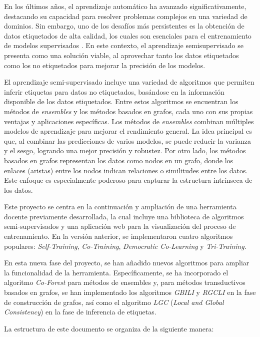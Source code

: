 
En los últimos años, el aprendizaje automático ha avanzado significativamente, destacando su capacidad para resolver problemas complejos en una variedad de dominios. Sin embargo, uno de los desafíos más persistentes es la obtención de datos etiquetados de alta calidad, los cuales son esenciales para el entrenamiento de modelos supervisados . En este contexto, el aprendizaje semisupervisado se presenta como una solución viable, al aprovechar tanto los datos etiquetados como los no etiquetados para mejorar la precisión de los modelos.

El aprendizaje semi-supervisado incluye una variedad de algoritmos que permiten inferir etiquetas para datos no etiquetados, basándose en la información disponible de los datos etiquetados. Entre estos algoritmos se encuentran los métodos de \textit{ensembles} y los métodos basados en grafos, cada uno con sus propias ventajas y aplicaciones específicas. Los métodos de \textit{ensembles} combinan múltiples modelos de aprendizaje para mejorar el rendimiento general. La idea principal es que, al combinar las predicciones de varios modelos, se puede reducir la varianza y el sesgo, logrando una mejor precisión y robustez. Por otro lado, los métodos basados en grafos representan los datos como nodos en un grafo, donde los enlaces (aristas) entre los nodos indican relaciones o similitudes entre los datos. Este enfoque es especialmente poderoso para capturar la estructura intrínseca de los datos.

Este proyecto se centra en la continuación y ampliación de una herramienta docente previamente desarrollada, la cual incluye una biblioteca de algoritmos semi-supervisados y una aplicación web para la visualización del proceso de entrenamiento. En la versión anterior, se implementaron cuatro algoritmos populares: \textit{Self-Training}, \textit{Co-Training}, \textit{Democratic Co-Learning} y \textit{Tri-Training}.

En esta nueva fase del proyecto, se han añadido nuevos algoritmos para ampliar la funcionalidad de la herramienta. Específicamente, se ha incorporado el algoritmo \textit{Co-Forest} para métodos de ensembles y, para métodos transductivos basados en grafos, se han implementado los algoritmos \textit{GBILI} y \textit{RGCLI} en la fase de construcción de grafos, así como el algoritmo \textit{LGC} (\textit{Local and Global Consistency}) en la fase de inferencia de etiquetas.

La estructura de este documento se organiza de la siguiente manera:

